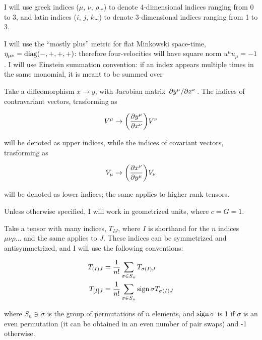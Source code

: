 \documentclass[main.tex]{subfiles}
\begin{document}
I will use greek indices ($\mu$, $\nu$, $\rho$\dots) to denote 4-dimensional indices ranging from 0 to 3, and latin indices ($i$, $j$, $k$\dots) to denote 3-dimensional indices ranging from 1 to 3.

I will use the ``mostly plus'' metric for flat Minkowski space-time, $\eta_{\mu \nu} = \operatorname{diag}(-, +, +, +)$: therefore four-velocities will have square norm \(u^\mu u_\mu = -1\).
I will use Einstein summation convention: if an index appears multiple times in the same monomial, it is meant to be summed over

Take a diffeomorphism $x \rightarrow y$, with Jacobian matrix $\pdv*{y^\mu}{x^\nu}$.
The indices of contravariant vectors, trasforming as

\begin{equation}
    V^\mu \rightarrow \qty( \pdv{y^\mu}{x^\nu})  V^\nu
\end{equation}

will be denoted as upper indices, while the indices of covariant vectors, trasforming as

\begin{equation}
V_\mu \rightarrow \qty( \pdv{x^\nu}{y^\mu})  V_\nu
\end{equation}

will be denoted as lower indices; the same applies to higher rank tensors.

Unless otherwise specified, I will work in geometrized units, where $c = G = 1$.

Take a tensor with many indices, $T_{IJ}$, where $I$ is shorthand for the $n$ indices $\mu \nu \rho \dots$ and the same applies to $J$. These indices can be symmetrized and antisymmetrized, and I will use the following conventions:

\begin{align}
    T_{(I)J} &= \frac{1}{n!} \sum_{\sigma \in S_n} T_{\sigma(I)J} \\
    T_{[I]J} &= \frac{1}{n!} \sum_{\sigma \in S_n} \sign{\sigma} T_{\sigma(I)J}
\end{align}

where $S_n \ni \sigma $ is the group of permutations of $n$ elements, and $\operatorname{sign}{\sigma}$ is 1 if $\sigma$ is an even permutation (it can be obtained in an even number of pair swaps) and -1 otherwise.
\end{document}
